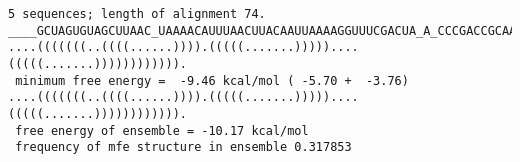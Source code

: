 \documentclass[]{article}
\begin{document}
  \begin{center}
    \begin{verbatim} 
5 sequences; length of alignment 74.
____GCUAGUGUAGCUUAAC_UAAAACAUUUAACUUACAAUUAAAAGGUUUCGACUA_A_CCCGACCGCAAGGA
....(((((((..((((......)))).(((((.......)))))....(((((.......)))))))))))).
 minimum free energy =  -9.46 kcal/mol ( -5.70 +  -3.76)
....(((((((..((((......)))).(((((.......)))))....(((((.......)))))))))))).
 free energy of ensemble = -10.17 kcal/mol
 frequency of mfe structure in ensemble 0.317853
    \end{verbatim}
  \end{center}
\end{document}
